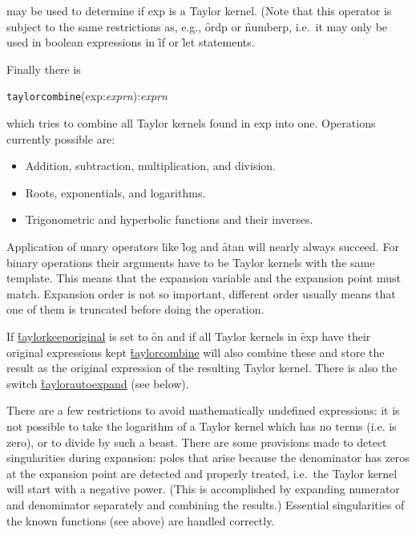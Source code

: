 may be used to determine if exp is a Taylor kernel.
 (Note that this operator is subject to the same
restrictions as, e.g., \f{ordp} or \f{numberp}, i.e.\ it may only be used in
boolean expressions in \f{if} or \f{let} statements. 

Finally there is

\hypertarget{operator:TAYLORCOMBINE}{}
\hspace*{2em} \texttt{taylorcombine}(exp:{\em exprn}):{\em exprn}

which tries to combine all Taylor kernels found in exp into one.
Operations currently possible are:
\begin{itemize}
  \item Addition, subtraction, multiplication, and division.
  \item Roots, exponentials, and logarithms.
  \item Trigonometric and hyperbolic functions and their inverses.
\end{itemize}
Application of unary operators like \f{log} and \f{atan} will
nearly always succeed. For binary operations their arguments have to be
Taylor kernels with the same template. This means that the expansion
variable and the expansion point must match. Expansion order is not so
important, different order usually means that one of them is truncated
before doing the operation.

 
If \hyperlink{switch:TAYLORKEEPORIGINAL}{\f{taylorkeeporiginal}} is set to \f{on} and if all Taylor
kernels in \f{exp} have their original expressions kept
\hyperlink{operator:TAYLORCOMBINE}{\f{taylorcombine}} will also combine these and store the result
as the original expression of the resulting Taylor kernel.
There is also the switch \hyperlink{switch:TAYLORAUTOEXPAND}{\f{taylorautoexpand}} (see below).

There are a few restrictions to avoid mathematically undefined
expressions: it is not possible to take the logarithm of a Taylor
kernel which has no terms (i.e. is zero), or to divide by such a
beast.  There are some provisions made to detect singularities during
expansion: poles that arise because the denominator has zeros at the
expansion point are detected and properly treated, i.e.\ the Taylor
kernel will start with a negative power.  (This is accomplished by
expanding numerator and denominator separately and combining the
results.)  Essential singularities of the known functions (see above)
are handled correctly.

